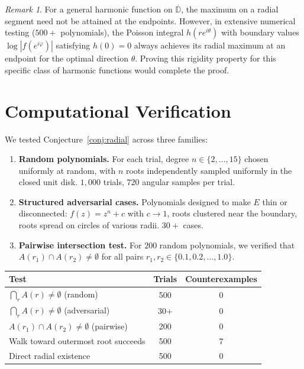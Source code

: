 \documentclass[11pt]{article}
\theoremstyle{definition}
\theoremstyle{remark}
\newtheorem{remark}[theorem]{Remark}
\begin{document}
\begin{remark}
For a general harmonic function on $\overline{\mathbb{D}}$, the maximum on a radial segment need not be attained at the endpoints. However, in extensive numerical testing ($500+$ polynomials), the Poisson integral $h(re^{i\theta})$ with boundary values $\log|f(e^{i\varphi})|$ satisfying $h(0)=0$ always achieves its radial maximum at an endpoint for the optimal direction $\theta$. Proving this rigidity property for this specific class of harmonic functions would complete the proof.
\end{remark}

\section{Computational Verification}\label{sec:computation}

We tested Conjecture~\ref{conj:radial} across three families:

\begin{enumerate}
\item \textbf{Random polynomials.} For each trial, degree $n\in\{2,\ldots,15\}$ chosen uniformly at random, with $n$ roots independently sampled uniformly in the closed unit disk. $1{,}000$ trials, $720$ angular samples per trial.

\item \textbf{Structured adversarial cases.} Polynomials designed to make $E$ thin or disconnected: $f(z)=z^n+c$ with $c\to 1$, roots clustered near the boundary, roots spread on circles of various radii. $30+$ cases.

\item \textbf{Pairwise intersection test.} For $200$ random polynomials, we verified that $A(r_1)\cap A(r_2)\neq\emptyset$ for all pairs $r_1,r_2\in\{0.1,0.2,\ldots,1.0\}$.
\end{enumerate}

\begin{center}
\begin{tabular}{lcc}
\hline
Test & Trials & Counterexamples \\
\hline
$\bigcap_{r} A(r)\neq\emptyset$ (random) & 500 & 0 \\
$\bigcap_{r} A(r)\neq\emptyset$ (adversarial) & 30+ & 0 \\
$A(r_1)\cap A(r_2)\neq\emptyset$ (pairwise) & 200 & 0 \\
Walk toward outermost root succeeds & 500 & 7 \\
Direct radial existence & 500 & 0 \\
\hline
\end{tabular}
\end{center}
\end{document}

